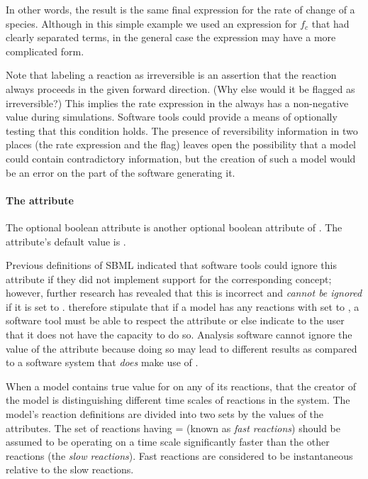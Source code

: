 In other words, the result is the same final expression for the
rate of change of a species.  Although in this simple example we
used an expression for $f_c$ that had clearly separated terms, in
the general case the expression may have a more complicated form.

Note that labeling a reaction as irreversible is an assertion that
the reaction always proceeds in the given forward direction.  (Why
else would it be flagged as irreversible?)  This implies the rate
expression in the \KineticLaw always has a non-negative value
during simulations.  Software tools could provide a means of
optionally testing that this condition holds.  The presence of
reversibility information in two places (\ie the rate expression
and the  flag) leaves open the possibility that
a model could contain contradictory information, but the creation
of such a model would be an error on the part of the software
generating it.


\paragraph{The  attribute}
\label{sec:fast}

The optional boolean attribute  is another optional
boolean attribute of \Reaction.  The attribute's
default value is .

Previous definitions of SBML indicated that software tools could
ignore this attribute if they did not implement support for the
corresponding concept; however, further research has revealed that
this is incorrect and  \emph{cannot be ignored} if it
is set to .  \sbmltwothree {} therefore stipulate that if a
model has any reactions with  set to , a
software tool must be able to respect the attribute or else indicate
to the user that it does not have the capacity to do so.  Analysis
software cannot ignore the value of the  attribute
because doing so may lead to different results as compared to a
software system that \emph{does} make use of .

When a model contains  true value for  on any of its
reactions,  that the creator of the model is
distinguishing different time scales of reactions in the system.
The model's reaction definitions are divided into two sets by the
values of the  attributes.  The set of reactions having
= (known as \emph{fast reactions}) should be
assumed to be operating on a time scale significantly faster than
the other reactions (the \emph{slow reactions}).  Fast reactions
are considered to be instantaneous relative to the slow reactions.

